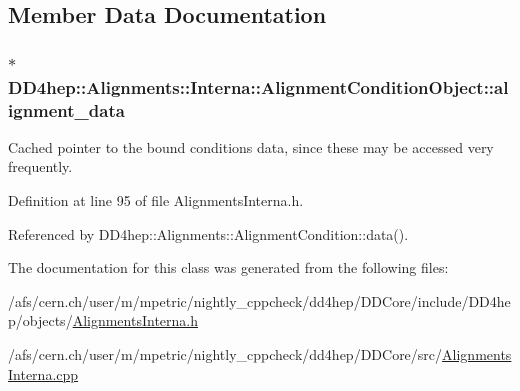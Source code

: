 \subsection{Member Data Documentation}
\hypertarget{class_d_d4hep_1_1_alignments_1_1_interna_1_1_alignment_condition_object_ac7ed3f9b51220db13f6d829198f3ea10}{
\subsubsection[{alignment\_\-data}]{$\ast$ {\bf DD4hep::Alignments::Interna::AlignmentConditionObject::alignment\_\-data}}}
\label{class_d_d4hep_1_1_alignments_1_1_interna_1_1_alignment_condition_object_ac7ed3f9b51220db13f6d829198f3ea10}


Cached pointer to the bound conditions data, since these may be accessed very frequently. 

Definition at line 95 of file AlignmentsInterna.h.

Referenced by DD4hep::Alignments::AlignmentCondition::data().

The documentation for this class was generated from the following files:\begin{DoxyCompactItemize}
\item 
/afs/cern.ch/user/m/mpetric/nightly\_\-cppcheck/dd4hep/DDCore/include/DD4hep/objects/\hyperlink{_alignments_interna_8h}{AlignmentsInterna.h}\item 
/afs/cern.ch/user/m/mpetric/nightly\_\-cppcheck/dd4hep/DDCore/src/\hyperlink{_alignments_interna_8cpp}{AlignmentsInterna.cpp}\end{DoxyCompactItemize}

